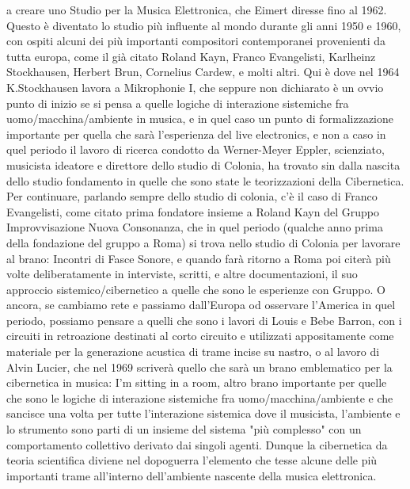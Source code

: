 a creare uno Studio per la Musica Elettronica, che Eimert diresse fino al 1962.
Questo è diventato lo studio più influente al mondo durante gli anni 1950 e 1960,
con ospiti alcuni dei più importanti compositori contemporanei provenienti da tutta europa,
come il già citato Roland Kayn, Franco Evangelisti, Karlheinz Stockhausen, Herbert Brun,
Cornelius Cardew, e molti altri.
Qui è dove nel 1964 K.Stockhausen lavora a Mikrophonie I, che seppure non dichiarato è un ovvio punto di inizio
se si pensa a quelle logiche di interazione sistemiche fra uomo/macchina/ambiente in musica,
e in quel caso un punto di formalizzazione importante per quella che sarà l'esperienza del live electronics,
e non a caso in quel periodo il lavoro di ricerca condotto da Werner-Meyer Eppler,
scienziato, musicista ideatore e direttore dello studio di Colonia,
ha trovato sin dalla nascita dello studio fondamento in quelle che sono state
le teorizzazioni della Cibernetica.
Per continuare, parlando sempre dello studio di colonia, c'è il caso di Franco Evangelisti,
come citato prima fondatore insieme a Roland Kayn del Gruppo Improvvisazione Nuova Consonanza,
che in quel periodo (qualche anno prima della fondazione del gruppo a Roma)
si trova nello studio di Colonia per lavorare al brano: Incontri di Fasce Sonore,
e quando farà ritorno a Roma poi citerà più volte deliberatamente in interviste, scritti,
e altre documentazioni, il suo approccio sistemico/cibernetico a quelle che sono le esperienze con
Gruppo.
O ancora, se cambiamo rete e passiamo dall'Europa od osservare l'America in quel periodo,
possiamo pensare a quelli che sono i lavori di Louis e Bebe Barron,
con i circuiti in retroazione destinati al corto circuito
e utilizzati appositamente come materiale per la generazione acustica di trame incise su nastro,
o al lavoro di Alvin Lucier, che nel 1969 scriverà quello che sarà un brano emblematico per
la cibernetica in musica: I'm sitting in a room, altro brano importante per quelle che sono
le logiche di interazione sistemiche fra uomo/macchina/ambiente e che sancisce una volta per tutte
l'interazione sistemica dove il musicista, l'ambiente e lo strumento sono parti di un insieme del
sistema "più complesso" con un comportamento collettivo derivato dai singoli agenti.
Dunque la cibernetica da teoria scientifica diviene nel dopoguerra
l'elemento che tesse alcune delle più importanti trame all'interno dell'ambiente
nascente della musica elettronica.
